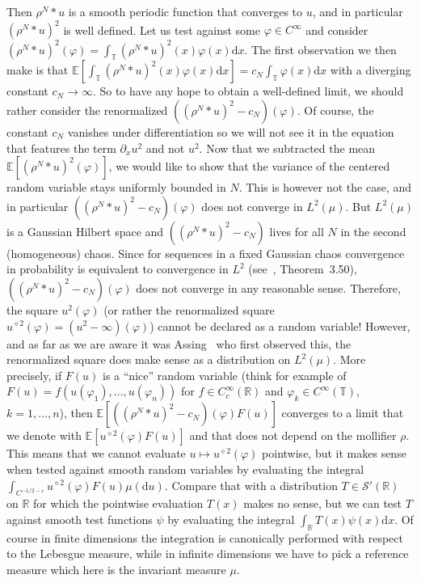 \documentclass[a4paper,11pt]{article}
\newcommand{\CS}{\mathscr{S}}
\newcommand{\R}{\mathbb{R}}
\newcommand{\T}{\mathbb{T}}
\newcommand{\E}{\mathbb{E}}
\newcommand{\1}{\mathds{1}}
\newcommand{\dd}{\mathrm{d}}
\begin{document}
Then $\rho^N \ast u$ is a smooth periodic function that converges to $u$, and in particular $(\rho^N \ast u)^2$ is well defined. Let us test against some $\varphi \in C^\infty$ and consider $(\rho^N \ast u)^2(\varphi) = \int_\T (\rho^N \ast u)^2(x) \varphi(x) \dd x$. The first observation we then make is that $\E[\int_\T (\rho^N \ast u)^2(x) \varphi(x) \dd x] = c_N \int_\T \varphi(x) \dd x$ with a diverging constant $c_N \to \infty$. So to have any hope to obtain a well-defined limit, we should rather consider the renormalized $((\rho^N \ast u)^2 - c_N)(\varphi)$. Of course, the constant $c_N$ vanishes under differentiation so we will not see it in the equation that features the term $\partial_x u^2$ and not $u^2$. Now that we subtracted the mean $\E[(\rho^N \ast u)^2(\varphi)]$, we would like to show that the variance of the centered random variable stays uniformly bounded in $N$. This is however not the case, and in particular $((\rho^N \ast u)^2 - c_N)(\varphi)$ does not converge in $L^2(\mu)$. But $L^2(\mu)$ is a Gaussian Hilbert space and $((\rho^N \ast u)^2 - c_N)$ lives for all $N$ in the second (homogeneous) chaos. Since for sequences in a fixed Gaussian chaos convergence in probability is equivalent to convergence in $L^2$ (see~\cite{J97}, Theorem~3.50), $((\rho^N \ast u)^2 - c_N)(\varphi)$ does not converge in any reasonable sense. Therefore, the square $u^2(\varphi)$ (or rather the renormalized square $u^{\diamond 2} (\varphi) = (u^2 - \infty) (\varphi)$) cannot be declared as a random variable! However, and as far as we are aware it was Assing~\cite{A02} who first observed this, the renormalized square does make sense as a distribution on $L^2(\mu)$. More precisely, if $F(u)$ is a ``nice'' random variable (think for example of $F(u) = f(u(\varphi_1), \dots, u(\varphi_n))$ for $f \in C^\infty_c(\R)$ and $\varphi_k \in C^\infty(\T)$, $k = 1, \dots, n$), then $\E[((\rho^N \ast u)^2 - c_N)(\varphi) F(u)]$ converges to a limit that we denote with $\E[u^{\diamond 2}(\varphi) F(u)]$ and that does not depend on the mollifier $\rho$. This means that we cannot evaluate $u \mapsto u^{\diamond 2}(\varphi)$ pointwise, but it makes sense when tested against smooth random variables by evaluating the integral $\int_{C^{-1/2-\varepsilon}} u^{\diamond 2}(\varphi) F(u) \mu(\dd u)$. Compare that with a distribution $T \in \CS'(\R)$ on $\R$ for which the pointwise evaluation $T(x)$ makes no sense, but we can test $T$ against smooth test functions $\psi$ by evaluating the integral $\int_\R T(x) \psi(x) \dd x$. Of course  in finite dimensions the integration is canonically performed with respect to  the Lebesgue measure, while in infinite dimensions we have to pick a reference measure which here is the invariant measure $\mu$.
\end{document}
